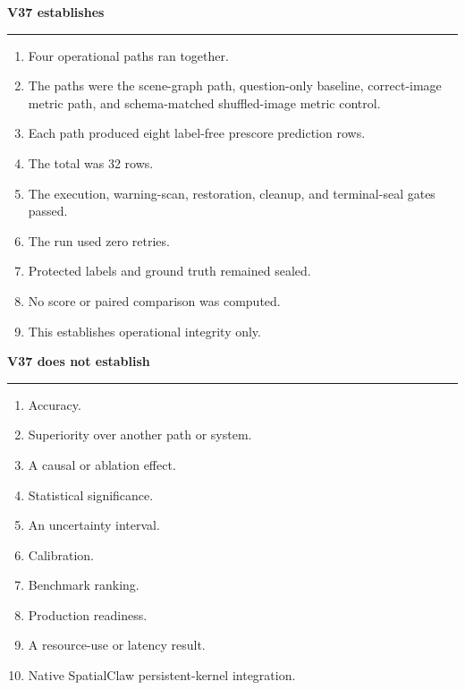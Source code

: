 \documentclass{article}
\begin{document}
\begin{table}[t]
\centering
\caption{This table quotes the V37 evidence record, which asks writers to use this wording and no stronger interpretation. In item 9 on the right, this paper writes ``resource-use'' in place of the record's term.}
\label{tab:v37}
\small
\begin{minipage}[t]{0.48\linewidth}
\raggedright
\textbf{V37 establishes}\par\smallskip\hrule\smallskip
\begin{enumerate}[leftmargin=*,nosep]
  \item Four operational paths ran together.
  \item The paths were the scene-graph path, question-only baseline, correct-image metric path, and schema-matched shuffled-image metric control.
  \item Each path produced eight label-free prescore prediction rows.
  \item The total was 32 rows.
  \item The execution, warning-scan, restoration, cleanup, and terminal-seal gates passed.
  \item The run used zero retries.
  \item Protected labels and ground truth remained sealed.
  \item No score or paired comparison was computed.
  \item This establishes operational integrity only.
\end{enumerate}
\end{minipage}\hfill
\begin{minipage}[t]{0.48\linewidth}
\raggedright
\textbf{V37 does not establish}\par\smallskip\hrule\smallskip
\begin{enumerate}[leftmargin=*,nosep]
  \item Accuracy.
  \item Superiority over another path or system.
  \item A causal or ablation effect.
  \item Statistical significance.
  \item An uncertainty interval.
  \item Calibration.
  \item Benchmark ranking.
  \item Production readiness.
  \item A resource-use or latency result.
  \item Native SpatialClaw persistent-kernel integration.
\end{enumerate}
\end{minipage}
\end{table}
\end{document}
